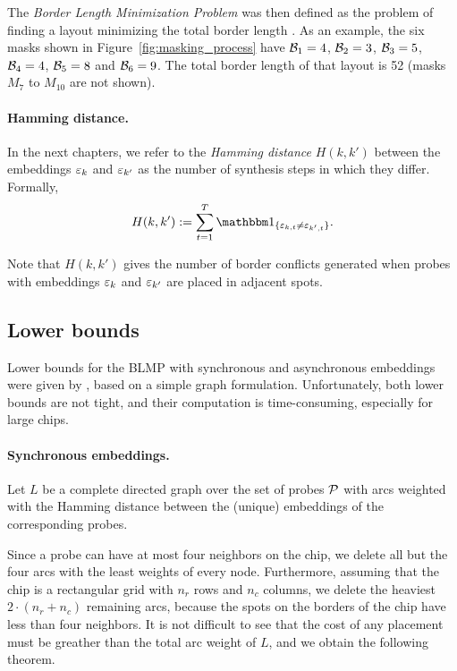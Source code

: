 The \emph{Border Length Minimization Problem} was then defined as the problem of
finding a layout minimizing the total border length \citep{Hannenhalli2002}. As
an example, the six masks shown in Figure~\ref{fig:masking_process} have
${\mathcal{B}}_1 = 4$, ${\mathcal{B}}_2 = 3$, ${\mathcal{B}}_3 = 5$, ${\mathcal{B}}_4 = 4$, ${\mathcal{B}}_5 = 8$ and
${\mathcal{B}}_6 = 9$. The total border length of that layout is 52 (masks $M_7$ to
$M_{10}$ are not shown).

\paragraph{Hamming distance.}
In the next chapters, we refer to the \emph{Hamming distance} $H(k,k')$ between
the embeddings $\varepsilon_k$ and $\varepsilon_{k'}$ as the number of synthesis steps in
which they differ. Formally,
\begin{equation}\label{eq:hamming}
  H(k,k') := \sum_{t=1}^{T} \Ind{\eps_{k,t} \neq \eps_{k',t}}.
\end{equation}

Note that $H(k,k')$ gives the number of border conflicts generated when probes
with embeddings $\varepsilon_k$ and $\varepsilon_{k'}$ are placed in adjacent spots.

\subsection{Lower bounds}

Lower bounds for the BLMP with synchronous and asynchronous embeddings were
given by \citet{Kahng2002}, based on a simple graph formulation. Unfortunately,
both lower bounds are not tight, and their computation is time-consuming,
especially for large chips.

\paragraph{Synchronous embeddings.}
Let $L$ be a complete directed graph over the set of probes ${\mathcal{P}}$ with arcs
weighted with the Hamming distance between the (unique) embeddings of the
corresponding probes.

Since a probe can have at most four neighbors on the chip, we delete all but the
four arcs with the least weights of every node. Furthermore, assuming that the
chip is a rectangular grid with $n_r$ rows and $n_c$ columns, we delete the
heaviest $2 \cdot (n_r + n_c)$ remaining arcs, because the spots on the borders
of the chip have less than four neighbors. It is not difficult to see that the
cost of any placement must be greather than the total arc weight of $L$, and we
obtain the following theorem.

